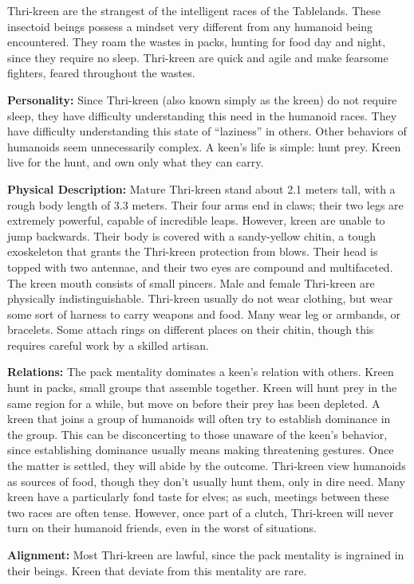 Thri-kreen are the strangest of the intelligent races of the Tablelands. These insectoid beings possess a mindset very different from any humanoid being encountered. They roam the wastes in packs, hunting for food day and night, since they require no sleep. Thri-kreen are quick and agile and make fearsome fighters, feared throughout the wastes.

\textbf{Personality:} Since Thri-kreen (also known simply as the kreen) do not require sleep, they have difficulty understanding this need in the humanoid races. They have difficulty understanding this state of ``laziness'' in others. Other behaviors of humanoids seem unnecessarily complex. A keen's life is simple: hunt prey. Kreen live for the hunt, and own only what they can carry.

\textbf{Physical Description:} Mature Thri-kreen stand about 2.1 meters tall, with a rough body length of 3.3 meters. Their four arms end in claws; their two legs are extremely powerful, capable of incredible leaps. However, kreen are unable to jump backwards. Their body is covered with a sandy-yellow chitin, a tough exoskeleton that grants the Thri-kreen protection from blows. Their head is topped with two antennae, and their two eyes are compound and multifaceted. The kreen mouth consists of small pincers. Male and female Thri-kreen are physically indistinguishable. Thri-kreen usually do not wear clothing, but wear some sort of harness to carry weapons and food. Many wear leg or armbands, or bracelets. Some attach rings on different places on their chitin, though this requires careful work by a skilled artisan.

\textbf{Relations:} The pack mentality dominates a keen's relation with others. Kreen hunt in packs, small groups that assemble together. Kreen will hunt prey in the same region for a while, but move on before their prey has been depleted. A kreen that joins a group of humanoids will often try to establish dominance in the group. This can be disconcerting to those unaware of the keen's behavior, since establishing dominance usually means making threatening gestures. Once the matter is settled, they will abide by the outcome. Thri-kreen view humanoids as sources of food, though they don't usually hunt them, only in dire need. Many kreen have a particularly fond taste for elves; as such, meetings between these two races are often tense. However, once part of a clutch, Thri-kreen will never turn on their humanoid friends, even in the worst of situations.

\textbf{Alignment:} Most Thri-kreen are lawful, since the pack mentality is ingrained in their beings. Kreen that deviate from this mentality are rare.


